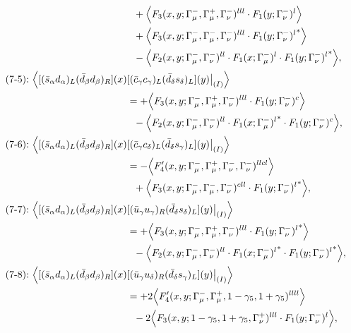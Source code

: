 \begin{align}
\notag\\*&\ \ 
 + \Big\langle F_3(x,y;\Gamma_\mu^-,\Gamma_\mu^+,\Gamma_\nu^-)^{lll} \cdot F_1(y;\Gamma_\nu^-)^l\Big\rangle
\notag\\*&\ \ 
 + \Big\langle F_3(x,y;\Gamma_\mu^-,\Gamma_\mu^-,\Gamma_\nu^-)^{lll} \cdot {F_1(y;\Gamma_\nu^-)^l}^*\Big\rangle
\notag\\*&\ \ 
 - \Big\langle F_2(x,y;\Gamma_\mu^-,\Gamma_\nu^-)^{ll} \cdot F_1(x;\Gamma_\mu^-)^l \cdot {F_1(y;\Gamma_\nu^-)^l}^*\Big\rangle,
\\
\mbox{(7-5):}\ 
\Big\langle
[(\bar s_\alpha d_\alpha)_L(\bar d_\beta d_\beta)_R](x)&
[(\bar c_\gamma c_\gamma)_L(\bar d_\delta s_\delta)_L](y)\big|_{(I)}
\Big\rangle
\notag\\*
&=
 + \Big\langle F_3(x,y;\Gamma_\mu^-,\Gamma_\mu^+,\Gamma_\nu^-)^{lll} \cdot F_1(y;\Gamma_\nu^-)^c\Big\rangle
\notag\\*&\ \ 
 - \Big\langle F_2(x,y;\Gamma_\mu^-,\Gamma_\nu^-)^{ll} \cdot {F_1(x;\Gamma_\mu^-)^l}^* \cdot F_1(y;\Gamma_\nu^-)^c\Big\rangle,
\\
\mbox{(7-6):}\ 
\Big\langle
[(\bar s_\alpha d_\alpha)_L(\bar d_\beta d_\beta)_R](x)&
[(\bar c_\gamma c_\delta)_L(\bar d_\delta s_\gamma)_L](y)\big|_{(I)}
\Big\rangle
\notag\\*
&=
 - \Big\langle F_4'(x,y;\Gamma_\mu^-,\Gamma_\mu^+,\Gamma_\nu^-,\Gamma_\nu^-)^{llcl}\Big\rangle
\notag\\*&\ \ 
 + \Big\langle F_3(x,y;\Gamma_\mu^-,\Gamma_\mu^-,\Gamma_\nu^-)^{cll} \cdot {F_1(y;\Gamma_\nu^-)^l}^*\Big\rangle,
\\
\mbox{(7-7):}\ 
\Big\langle
[(\bar s_\alpha d_\alpha)_L(\bar d_\beta d_\beta)_R](x)&
[(\bar u_\gamma u_\gamma)_R(\bar d_\delta s_\delta)_L](y)\big|_{(I)}
\Big\rangle
\notag\\*
&=
 + \Big\langle F_3(x,y;\Gamma_\mu^-,\Gamma_\mu^+,\Gamma_\nu^-)^{lll} \cdot {F_1(y;\Gamma_\nu^-)^l}^*\Big\rangle
\notag\\*&\ \ 
 - \Big\langle F_2(x,y;\Gamma_\mu^-,\Gamma_\nu^-)^{ll} \cdot {F_1(x;\Gamma_\mu^-)^l}^* \cdot {F_1(y;\Gamma_\nu^-)^l}^*\Big\rangle,
\\
\mbox{(7-8):}\ 
\Big\langle
[(\bar s_\alpha d_\alpha)_L(\bar d_\beta d_\beta)_R](x)&
[(\bar u_\gamma u_\delta)_R(\bar d_\delta s_\gamma)_L](y)\big|_{(I)}
\Big\rangle
\notag\\*
&=
 + 2\Big\langle F_4'(x,y;\Gamma_\mu^-,\Gamma_\mu^+,1-\gamma_5,1+\gamma_5)^{llll}\Big\rangle
\notag\\*&\ \ 
-2\Big\langle F_3(x,y;1-\gamma_5,1+\gamma_5,\Gamma_\nu^+)^{lll} \cdot F_1(y;\Gamma_\nu^-)^l\Big\rangle,

\end{align}
